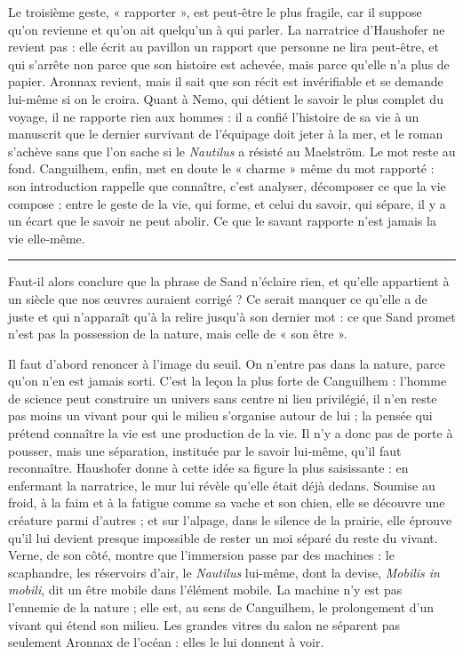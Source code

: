 \documentclass[11pt,a4paper]{article}
\begin{document}
Le troisième geste, « rapporter », est peut-être le plus fragile, car il suppose qu'on revienne et qu'on ait quelqu'un à qui parler. La narratrice d'Haushofer ne revient pas : elle écrit au pavillon un rapport que personne ne lira peut-être, et qui s'arrête non parce que son histoire est achevée, mais parce qu'elle n'a plus de papier. Aronnax revient, mais il sait que son récit est invérifiable et se demande lui-même si on le croira. Quant à Nemo, qui détient le savoir le plus complet du voyage, il ne rapporte rien aux hommes : il a confié l'histoire de sa vie à un manuscrit que le dernier survivant de l'équipage doit jeter à la mer, et le roman s'achève sans que l'on sache si le \emph{Nautilus} a résisté au Maelström. Le mot reste au fond. Canguilhem, enfin, met en doute le « charme » même du mot rapporté : son introduction rappelle que connaître, c'est analyser, décomposer ce que la vie compose ; entre le geste de la vie, qui forme, et celui du savoir, qui sépare, il y a un écart que le savoir ne peut abolir. Ce que le savant rapporte n'est jamais la vie elle-même.

\begin{center}\rule{0.5\linewidth}{0.5pt}\end{center}

Faut-il alors conclure que la phrase de Sand n'éclaire rien, et qu'elle appartient à un siècle que nos œuvres auraient corrigé ? Ce serait manquer ce qu'elle a de juste et qui n'apparaît qu'à la relire jusqu'à son dernier mot : ce que Sand promet n'est pas la possession de la nature, mais celle de « son être ».

Il faut d'abord renoncer à l'image du seuil. On n'entre pas dans la nature, parce qu'on n'en est jamais sorti. C'est la leçon la plus forte de Canguilhem : l'homme de science peut construire un univers sans centre ni lieu privilégié, il n'en reste pas moins un vivant pour qui le milieu s'organise autour de lui ; la pensée qui prétend connaître la vie est une production de la vie. Il n'y a donc pas de porte à pousser, mais une séparation, instituée par le savoir lui-même, qu'il faut reconnaître. Haushofer donne à cette idée sa figure la plus saisissante : en enfermant la narratrice, le mur lui révèle qu'elle était déjà dedans. Soumise au froid, à la faim et à la fatigue comme sa vache et son chien, elle se découvre une créature parmi d'autres ; et sur l'alpage, dans le silence de la prairie, elle éprouve qu'il lui devient presque impossible de rester un moi séparé du reste du vivant. Verne, de son côté, montre que l'immersion passe par des machines : le scaphandre, les réservoirs d'air, le \emph{Nautilus} lui-même, dont la devise, \emph{Mobilis in mobili}, dit un être mobile dans l'élément mobile. La machine n'y est pas l'ennemie de la nature ; elle est, au sens de Canguilhem, le prolongement d'un vivant qui étend son milieu. Les grandes vitres du salon ne séparent pas seulement Aronnax de l'océan : elles le lui donnent à voir.
\end{document}
